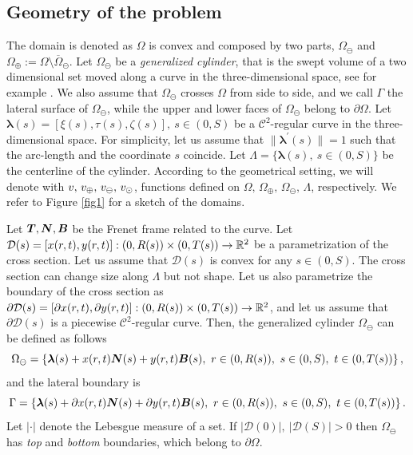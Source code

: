 \documentclass[r]{siamart171218}
\begin{document}
\subsection{Geometry of the problem}
The domain is denoted as $\Omega$ is convex and composed by two parts, 
$\Omega_{\ominus}$ and $\Omega_{\oplus}:=\Omega\setminus\overline{\Omega}_{\ominus}$. 
Let $\Omega_{\ominus}$ be a \emph{generalized cylinder}, 
that is the swept volume of a two dimensional set moved along a curve in the three-dimensional space, see for example \cite{MR1940257}.
We also assume that $\Omega_{\ominus}$ crosses $\Omega$ from side to side, and we call $\Gamma$ the lateral surface of $\Omega_{\ominus}$, 
while the upper and lower faces of $\Omega_{\ominus}$ belong to $\partial\Omega$. 
Let $\boldsymbol \lambda(s) = [\xi(s), \tau(s), \zeta(s)], \ s\in(0,S)$ be a $\mathcal{C}^2$-regular curve in the three-dimensional space.
For simplicity, let us assume that $\|\boldsymbol \lambda^\prime(s)\|=1$ such that the arc-length and the coordinate $s$ coincide.
Let $\Lambda = \{\boldsymbol \lambda(s), \ s\in(0,S)\}$ be the centerline of the cylinder. 
According to the geometrical setting, we will denote with $v,\,v_\oplus,\,v_\ominus,\,v_{\odot}$,
functions defined on $\Omega,\,\Omega_{\oplus},\,\Omega_{\ominus},\,\Lambda$, respectively.
We refer to Figure \ref{fig1} for a sketch of the domains.

Let $\boldsymbol T,\boldsymbol N,\boldsymbol B$ be the Frenet frame related to the curve.
Let $\mathcal{D}(s) = [x(r,t),y(r,t)]: (0,R(s))\times(0,T(s)) \rightarrow \mathbb{R}^2$ be a parametrization of the cross section.
Let us assume that $\mathcal{D}(s)$ is convex for any $s \in (0,S)$. The cross section can change size along $\Lambda$ but not shape.
Let us also parametrize the boundary of the cross section as $\partial\mathcal{D}(s) = [\partial x(r,t),\partial y(r,t)]: (0,R(s))\times(0,T(s)) \rightarrow \mathbb{R}^2$,
and let us assume that $\partial\mathcal{D}(s)$ is a piecewise $\mathcal{C}^2$-regular curve.
Then, the generalized cylinder $\Omega_{\ominus}$ can be defined as follows
\begin{equation*}
\Omega_{\ominus} = \{ \boldsymbol \lambda(s) + x(r,t) \boldsymbol N(s) + y(r,t) \boldsymbol B(s), \ r \in (0,R(s)),\ s \in (0,S), \ t \in (0,T(s))\}\,,
\end{equation*}
and the lateral boundary is
\begin{equation*}
\Gamma = \{ \boldsymbol \lambda(s) + \partial x(r,t) \boldsymbol N(s) + \partial y(r,t) \boldsymbol B(s), \ r \in (0,R(s)),\ s \in (0,S), \ t \in (0,T(s))\}\,.
\end{equation*}
Let $|\cdot|$ denote the Lebesgue measure of a set. If $|\mathcal{D}(0)|, \ |\mathcal{D}(S)| >0$ then $\Omega_{\ominus}$ has \emph{top} and \emph{bottom} boundaries,
which belong to $\partial\Omega$.
\end{document}
